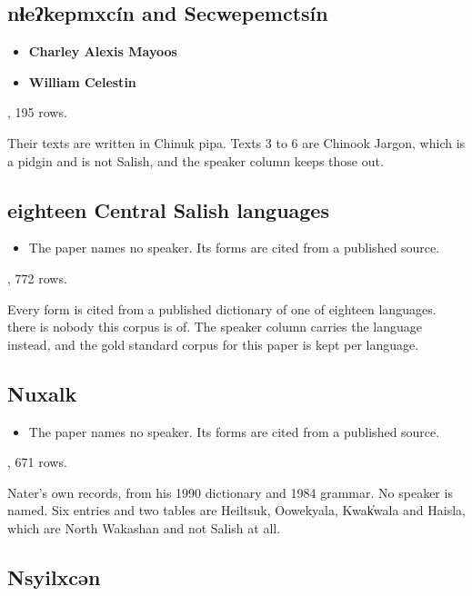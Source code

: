 \subsection{nɬeʔkepmxcín and Secwepemctsín}

\begin{itemize}
\item \textbf{Charley Alexis Mayoos}
\item \textbf{William Celestin}
\end{itemize}

\cite{src:Robertson-2012}, 195 rows.

Their texts are written in Chinuk pipa. Texts 3 to 6 are Chinook Jargon, which is a pidgin and is not Salish, and the speaker column keeps those out.

\subsection{eighteen Central Salish languages}

\begin{itemize}
\item The paper names no speaker. Its forms are cited from a published source.
\end{itemize}

\cite{src:Wolfe-2025}, 772 rows.

Every form is cited from a published dictionary of one of eighteen languages. there is nobody this corpus is of. The speaker column carries the language instead, and the gold standard corpus for this paper is kept per language.

\subsection{Nuxalk}

\begin{itemize}
\item The paper names no speaker. Its forms are cited from a published source.
\end{itemize}

\cite{src:Nater-2024}, 671 rows.

Nater's own records, from his 1990 dictionary and 1984 grammar. No speaker is named. Six entries and two tables are Heiltsuk, Oowekyala, Kwak̓wala and Haisla, which are North Wakashan and not Salish at all.

\subsection{Nsyilxcən}

